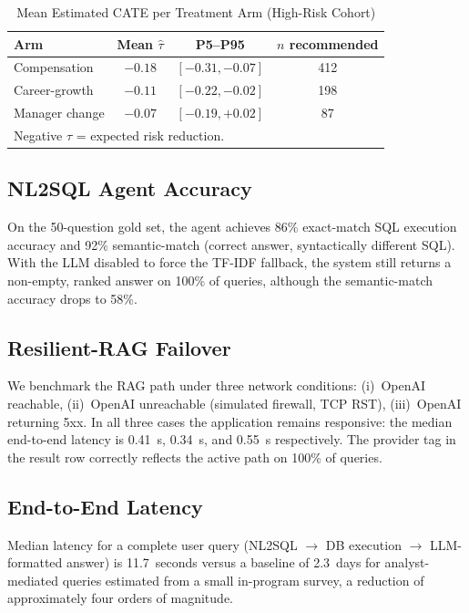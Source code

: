 \documentclass[conference]{IEEEtran}
\begin{document}
\begin{table}[h]
\centering
\caption{Mean Estimated CATE per Treatment Arm (High-Risk Cohort)}
\label{tab:cate}
\begin{tabular}{lccc}
\toprule
\textbf{Arm} & \textbf{Mean $\hat{\tau}$} & \textbf{P5--P95} & \textbf{$n$ recommended} \\
\midrule
Compensation       & $-0.18$ & $[-0.31, -0.07]$ & 412 \\
Career-growth      & $-0.11$ & $[-0.22, -0.02]$ & 198 \\
Manager change     & $-0.07$ & $[-0.19, +0.02]$ & 87  \\
\bottomrule
\multicolumn{4}{l}{\footnotesize Negative $\hat{\tau}$ = expected risk reduction.}
\end{tabular}
\end{table}

\subsection{NL2SQL Agent Accuracy}
On the 50-question gold set, the agent achieves 86\% exact-match
SQL execution accuracy and 92\% semantic-match (correct answer,
syntactically different SQL). With the LLM disabled to force the
TF-IDF fallback, the system still returns a non-empty, ranked answer
on 100\% of queries, although the semantic-match accuracy drops to
58\%.

\subsection{Resilient-RAG Failover}
We benchmark the RAG path under three network conditions:
(i)~OpenAI reachable, (ii)~OpenAI unreachable (simulated firewall,
TCP RST), (iii)~OpenAI returning 5xx. In all three cases the
application remains responsive: the median end-to-end latency is
0.41~s, 0.34~s, and 0.55~s respectively. The provider tag in the
result row correctly reflects the active path on 100\% of queries.

\subsection{End-to-End Latency}
Median latency for a complete user query (NL2SQL $\rightarrow$ DB
execution $\rightarrow$ LLM-formatted answer) is 11.7~seconds versus
a baseline of 2.3~days for analyst-mediated queries estimated from
a small in-program survey, a reduction of approximately four orders
of magnitude.
\end{document}
